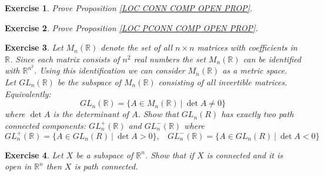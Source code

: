 \documentclass[11pt, letterpaper, oneside]{report}
\theoremstyle{pplain}
\newtheorem{ITERMVALUE THM}[theorem]{Intermediate Value Theorem}
\newtheorem{HEINEBOREL THM}[theorem]{Heine-Borel Theorem}
\newtheorem{UMETR THM}[theorem]{Urysohn Metrization Theorem}
\newtheorem{UMETR2 THM}[theorem]{Urysohn Metrization Theorem (v.2)}
\theoremstyle{ddefinition}
\theoremstyle{nnn}
\newtheorem{TDA NN}[theorem]{Topological Data Analysis. }
\theoremstyle{eexercise}
\newtheorem{exercise}{Exercise}[chapter]
\newcommand{\R}{{\mathbb R}}
\begin{document}
\begin{exercise}
Prove Proposition \ref{LOC CONN COMP OPEN PROP}. 
\end{exercise}



\begin{exercise}
Prove Proposition \ref{LOC PCONN COMP OPEN PROP}.
\end{exercise}







\begin{exercise}
Let $M_{n}(\R)$ denote the set of all $n\times n$ matrices with coefficients in $\R$. Since 
each matrix consists of $n^{2}$ real numbers the set $M_{n}(\R)$ can be identified with $\R^{n^{2}}$.
Using this identification we can consider $M_{n}(\R)$ as a metric space. Let $GL_{n}(\R)$ be the 
subspace of $M_{n}(\R)$ consisting of all invertible matrices. Equivalently:
$$GL_{n}(\R) = \{ A\in M_{n}(\R) \ | \ \det A \neq 0\}$$
where $\det A$ is the determinant of $A$. Show that $GL_{n}(R)$ has exactly two path connected components:
$GL_{n}^{+}(\R)$ and $GL_{n}^{-}(\R)$ where 
$$GL_{n}^{+}(\R) = \{ A\in GL_{n}(R) \ | \ \det A > 0\}, \ \ \ \ 
GL_{n}^{-}(\R) = \{ A\in GL_{n}(R) \ | \ \det A < 0\}$$
\end{exercise}







\begin{exercise}
\label{OPEN CONN IN RN IS PATH EXERCISE}
Let $X$ be a subspace of $\R^{n}$. Show that if $X$ is connected and it is open in $\R^{n}$
then $X$ is path connected. 
\end{exercise}
\end{document}
